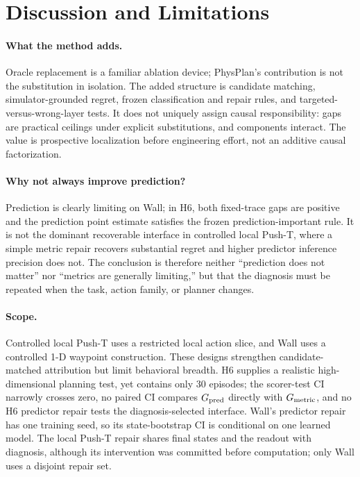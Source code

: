 \section{Discussion and Limitations}
\label{sec:limitations}

\paragraph{What the method adds.}
Oracle replacement is a familiar ablation device; PhysPlan's contribution is not the substitution in isolation. The added structure is candidate matching, simulator-grounded regret, frozen classification and repair rules, and targeted-versus-wrong-layer tests. It does not uniquely assign causal responsibility: gaps are practical ceilings under explicit substitutions, and components interact. The value is prospective localization before engineering effort, not an additive causal factorization.

\paragraph{Why not always improve prediction?}
Prediction is clearly limiting on Wall; in H6, both fixed-trace gaps are positive and the prediction point estimate satisfies the frozen prediction-important rule. It is not the dominant recoverable interface in controlled local Push-T, where a simple metric repair recovers substantial regret and higher predictor inference precision does not. The conclusion is therefore neither ``prediction does not matter'' nor ``metrics are generally limiting,'' but that the diagnosis must be repeated when the task, action family, or planner changes.

\paragraph{Scope.}
Controlled local Push-T uses a restricted local action slice, and Wall uses a controlled 1-D waypoint construction. These designs strengthen candidate-matched attribution but limit behavioral breadth. H6 supplies a realistic high-dimensional planning test, yet contains only 30 episodes; the scorer-test CI narrowly crosses zero, no paired CI compares $G_{\mathrm{pred}}$ directly with $G_{\mathrm{metric}}$, and no H6 predictor repair tests the diagnosis-selected interface. Wall's predictor repair has one training seed, so its state-bootstrap CI is conditional on one learned model. The local Push-T repair shares final states and the readout with diagnosis, although its intervention was committed before computation; only Wall uses a disjoint repair set.

